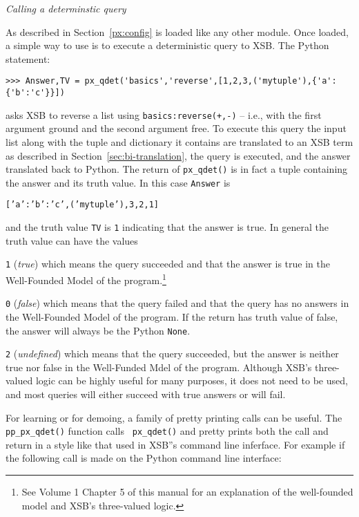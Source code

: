 \begin{example} \rm
{\em Calling a determinstic query}
  
  As described in Section~\ref{px:config} \px{} is loaded like any
  other module.  Once loaded, a simple way to use \px{} is to
  execute a deterministic query to XSB.  The Python statement:

\begin{verbatim}  
>>> Answer,TV = px_qdet('basics','reverse',[1,2,3,('mytuple'),{'a':{'b':'c'}}])
\end{verbatim}

\noindent
  asks XSB to reverse a list using {\tt basics:reverse(+,-)} -- i.e.,
  with the first argument ground and the second argument free.  To
  execute this query the input list along with the tuple and
  dictionary it contains are translated to an XSB term as described in
  Section~\ref{sec:bi-translation}, the query is executed, and the
  answer translated back to Python.  The return of {\tt px\_qdet()} is
  in fact a tuple containing the answer and its truth value.  In this
  case {\tt Answer} is

  {\tt [{'a':{'b':'c'}},('mytuple'),3,2,1]}

\noindent    
and the truth value {\tt TV} is {\tt 1} indicating that the answer is
true.  In general the truth value can have the values

\bi
\item {\tt 1} ({\em true}) which means the query succeeded and that
  the answer is true in the Well-Founded Model of the
  program.\footnote{See Volume 1 Chapter 5 of this manual for an
    explanation of the well-founded model and XSB's three-valued
    logic.}
\item {\tt 0} ({\em false}) which means that the query failed and that
  the query has no answers in the Well-Founded Model of the program.
  If the return has truth value of false, the answer will always be
  the Python {\tt None}.
\item {\tt 2} ({\em undefined}) which means that the query succeeded,
  but the answer is neither true nor false in the Well-Funded Mdel of
  the program.
  \ei
\noindent
Although XSB's three-valued logic can be highly useful for many
purposes, it does not need to be used, and most queries will either
succeed with true answers or will fail.

For learning \px{} or for demoing, a family of pretty printing calls
can be useful.  The {\tt pp\_px\_qdet()} function calls {\tt
  px\_qdet()} and pretty prints both the call and return in a style
like that used in XSB''s command line inferface.  For example if the
following call is made on the Python command line interface:


\end{example}
